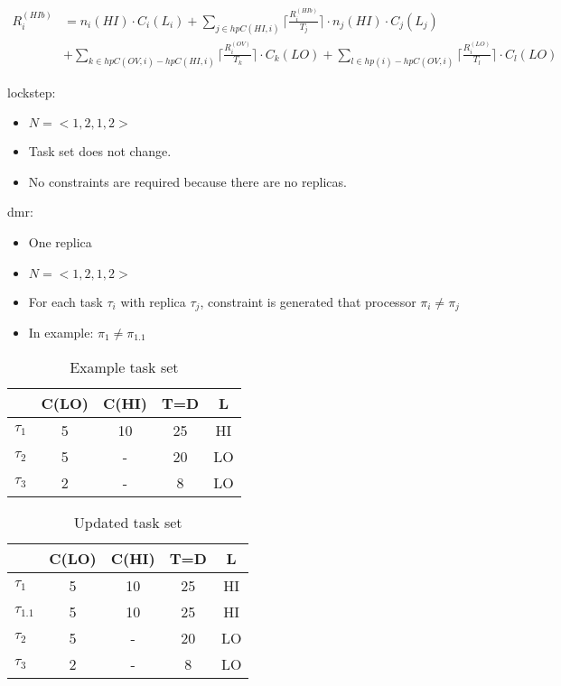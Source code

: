 \begin{equation}\label{eq:hiovmode}
\begin{aligned}
R_i^{(HIb)} & = n_i(HI) \cdot C_i(L_i) 
  +\sum_{j \in hpC(HI,i)}\Big\lceil\frac{R_i^{(HIb)}}{T_j}\Big\rceil \cdot n_j(HI) \cdot C_j(L_j) \\
&  +\sum_{k \in hpC(OV,i)-hpC(HI,i)}\Big\lceil\frac{R_i^{(OV)}}{T_k}\Big\rceil \cdot C_k(LO)
  +\sum_{l \in hp(i)-hpC(OV,i)}\Big\lceil\frac{R_i^{(LO)}}{T_l}\Big\rceil \cdot C_l(LO)
\end{aligned}
\end{equation}



lockstep:
\begin{itemize}
  \item $N=<1,2,1,2>$
  \item Task set does not change.
  \item No constraints are required because there are no replicas.
\end{itemize}

dmr:
\begin{itemize}
  \item One replica
  \item $N=<1,2,1,2>$
  \item For each task $\tau_i$ with replica $\tau_j$, constraint is generated that processor $\pi_i \ne \pi_j$
  \item In example: $\pi_1 \ne \pi_{1.1}$
\end{itemize}
\begin{table}
\centering
\caption{Example task set}
\begin{tabular}{@{}l|cccc@{}}
\toprule
		& C(LO) & C(HI) & T=D & L 	 \\\bottomrule
$\tau_1$ & 5 & 10 & 25 & HI  \\
$\tau_2$ & 5 & - & 20 & LO  \\
$\tau_3$ & 2 & - & 8 & LO  \\
\end{tabular}
\end{table}


\begin{table}
\centering
\caption{Updated task set}
\begin{tabular}{@{}l|cccc@{}}
\toprule
		& C(LO) & C(HI) & T=D & L	 \\\bottomrule
$\tau_1$ & 5 & 10 & 25 & HI  \\
$\tau_{1.1}$ & 5 & 10 & 25 & HI  \\
$\tau_2$ & 5 & - & 20 & LO  \\
$\tau_3$ & 2 & - & 8 & LO  \\
\end{tabular}
\end{table}


